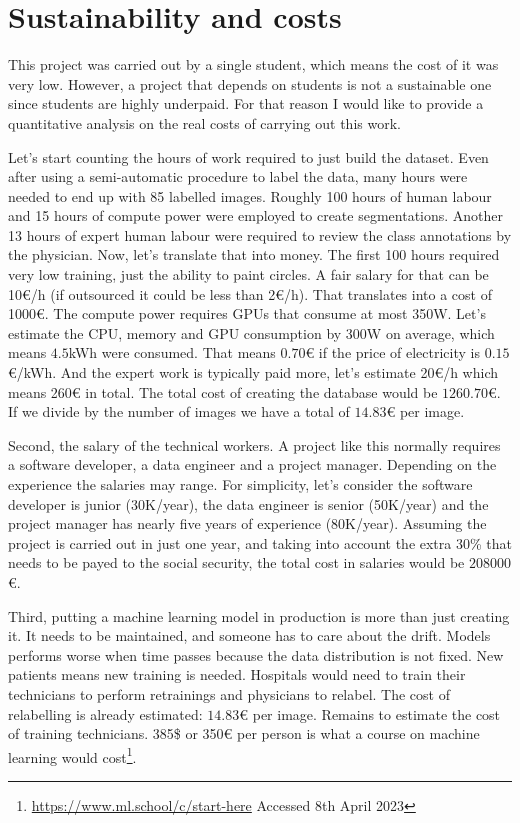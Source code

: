 \appendix
\chapter{Sustainability and costs}

This project was carried out by a single student, which means the cost of it was very low. However, a project that depends on students is not a sustainable one since students are highly underpaid. For that reason I would like to provide a quantitative analysis on the real costs of carrying out this work. 

Let's start counting the hours of work required to just build the dataset. Even after using a semi-automatic procedure to label the data, many hours were needed to end up with 85 labelled images. Roughly 100 hours of human labour and 15 hours of compute power were employed to create segmentations. Another 13 hours of expert human labour were required to review the class annotations by the physician. Now, let's translate that into money. The first 100 hours required very low training, just the ability to paint circles. A fair salary for that can be 10€/h (if outsourced it could be less than 2€/h). That translates into a cost of 1000€. The compute power requires GPUs that consume at most 350W. Let's estimate the CPU, memory and GPU consumption by 300W on average, which means $4.5$kWh were consumed. That means $0.70$€ if the price of electricity is $0.15$€/kWh. And the expert work is typically paid more, let's estimate 20€/h which means 260€ in total. The total cost of creating the database would be $1260.70$€. If we divide by the number of images we have a total of $14.83$€ per image. 

Second, the salary of the technical workers. A project like this normally requires a software developer, a data engineer and a project manager. Depending on the experience the salaries may range. For simplicity, let's consider the software developer is junior (30K/year), the data engineer is senior (50K/year) and the project manager has nearly five years of experience (80K/year). Assuming the project is carried out in just one year, and taking into account the extra 30\% that needs to be payed to the social security, the total cost in salaries would be $208000$€.

Third, putting a machine learning model in production is more than just creating it. It needs to be maintained, and someone has to care about the drift. Models performs worse when time passes because the data distribution is not fixed. New patients means new training is needed. Hospitals would need to train their technicians to perform retrainings and physicians to relabel. The cost of relabelling is already estimated: $14.83$€ per image. Remains to estimate the cost of training technicians. 385\$ or 350€ per person is what a course on machine learning would cost\footnote{\url{https://www.ml.school/c/start-here} Accessed 8th April 2023}.

